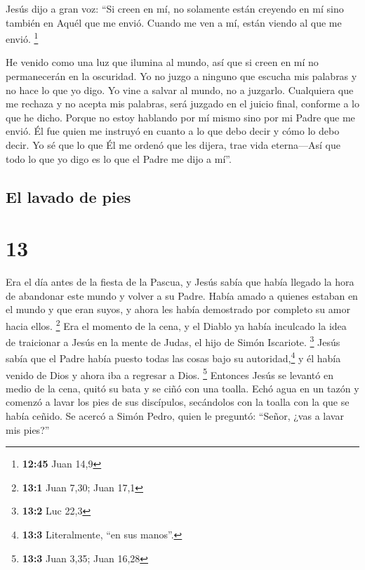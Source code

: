  Jesús dijo a gran voz: ``Si creen en mí, no solamente
están creyendo en mí sino también en Aquél que me envió. 
Cuando me ven a mí, están viendo al que me envió. \footnote{\textbf{12:45}
  Juan 14,9}

 He venido como una luz que ilumina al mundo, así que si
creen en mí no permanecerán en la oscuridad.  Yo no juzgo
a ninguno que escucha mis palabras y no hace lo que yo digo. Yo vine a
salvar al mundo, no a juzgarlo.  Cualquiera que me
rechaza y no acepta mis palabras, será juzgado en el juicio final,
conforme a lo que he dicho.  Porque no estoy hablando por
mí mismo sino por mi Padre que me envió. Él fue quien me instruyó en
cuanto a lo que debo decir y cómo lo debo decir.  Yo sé
que lo que Él me ordenó que les dijera, trae vida eterna---Así que todo
lo que yo digo es lo que el Padre me dijo a mí''.

\hypertarget{el-lavado-de-pies}{%
\subsection{El lavado de pies}\label{el-lavado-de-pies}}

\hypertarget{section-12}{%
\section{13}\label{section-12}}

 Era el día antes de la fiesta de la Pascua, y Jesús sabía
que había llegado la hora de abandonar este mundo y volver a su Padre.
Había amado a quienes estaban en el mundo y que eran suyos, y ahora les
había demostrado por completo su amor hacia ellos. \footnote{\textbf{13:1}
  Juan 7,30; Juan 17,1}  Era el momento de la cena, y el
Diablo ya había inculcado la idea de traicionar a Jesús en la mente de
Judas, el hijo de Simón Iscariote. \footnote{\textbf{13:2} Luc 22,3}
 Jesús sabía que el Padre había puesto todas las cosas
bajo su autoridad,\footnote{\textbf{13:3} Literalmente, ``en sus
  manos''.} y él había venido de Dios y ahora iba a regresar a Dios.
\footnote{\textbf{13:3} Juan 3,35; Juan 16,28}  Entonces
Jesús se levantó en medio de la cena, quitó su bata y se ciñó con una
toalla.  Echó agua en un tazón y comenzó a lavar los pies
de sus discípulos, secándolos con la toalla con la que se había ceñido.
 Se acercó a Simón Pedro, quien le preguntó: ``Señor, ¿vas
a lavar mis pies?''

